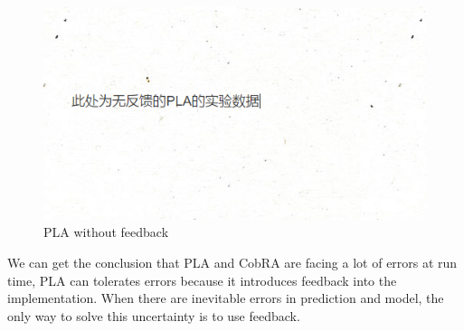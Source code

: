 \documentclass[sigconf]{acmart}
\begin{document}
\begin{figure}[h]
	\centering
	\includegraphics[width=\linewidth]{planokalman}
	\caption{PLA without feedback}
\end{figure}

We can get the conclusion that PLA and CobRA are facing a lot of errors at run time, PLA can tolerates errors because it introduces feedback into the implementation. When there are inevitable errors in prediction and model, the only way to solve this uncertainty is to use feedback.
\end{document}
